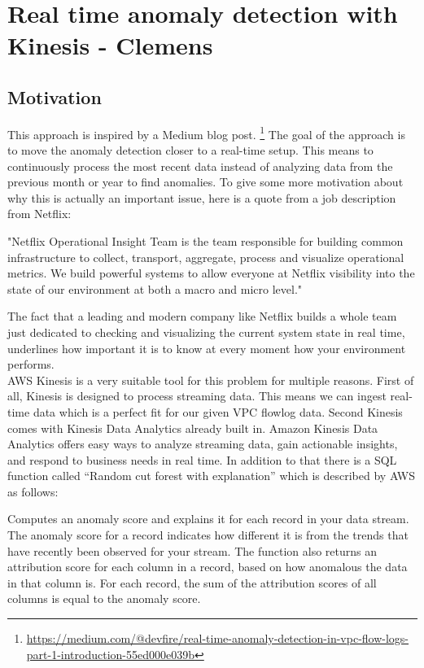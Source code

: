 \section{Real time anomaly detection with Kinesis - Clemens}
\label{sec:real_time_anomaly_detection}
    \subsection{Motivation}
    This approach is inspired by a Medium blog post. 
    \footnote{\scriptsize{\url{https://medium.com/@devfire/real-time-anomaly-detection-in-vpc-flow-logs-part-1-introduction-55ed000e039b}}}
    The goal of the approach is to move the anomaly detection closer to a real-time setup. This means to continuously process the most recent data instead of analyzing data from the previous month or year to find anomalies. To give some more motivation about why this is actually an important issue, here is a quote from a job description from Netflix:
    \begin{displayquote}
        "Netflix Operational Insight Team is the team responsible for building common infrastructure to collect, transport, aggregate, process and visualize operational metrics. We build powerful systems to allow everyone at Netflix visibility into the state of our environment at both a macro and micro level."
    \end{displayquote}
    The fact that a leading and modern company like Netflix builds a whole team just dedicated to checking and visualizing the current system state in real time, underlines how important it is to know at every moment how your environment performs.\\
    AWS Kinesis is a very suitable tool for this problem for multiple reasons. First of all, Kinesis is designed to process streaming data. This means we can ingest real-time data which is a perfect fit for our given VPC flowlog data. Second Kinesis comes with Kinesis Data Analytics already built in. Amazon Kinesis Data Analytics offers easy ways to analyze streaming data, gain actionable insights, and respond to business needs in real time. In addition to that there is a SQL function called “Random cut forest with explanation” which is described by AWS as follows:
    \begin{displayquote}
        Computes an anomaly score and explains it for each record in your data stream. The anomaly score for a record indicates how different it is from the trends that have recently been observed for your stream. The function also returns an attribution score for each column in a record, based on how anomalous the data in that column is. For each record, the sum of the attribution scores of all columns is equal to the anomaly score. \cite{awsRcf}
    \end{displayquote}

